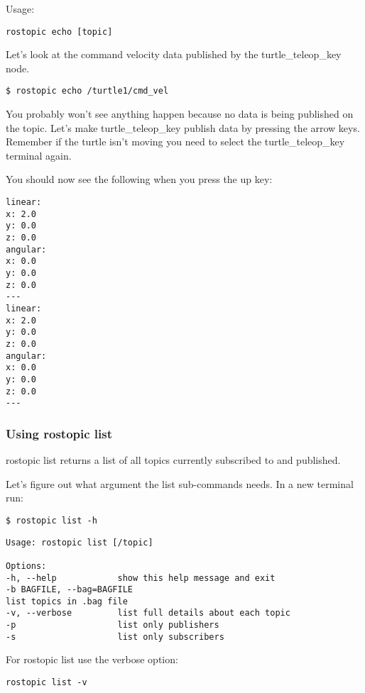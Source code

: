 Usage:
\begin{lstlisting}[breaklines=true languages=bash]
rostopic echo [topic]
\end{lstlisting}

Let's look at the command velocity data published by the turtle\_teleop\_key node.

\begin{lstlisting}[breaklines=true languages=bash]
$ rostopic echo /turtle1/cmd_vel
\end{lstlisting}

You probably won't see anything happen because no data is being published on the topic. Let's make turtle\_teleop\_key publish data by pressing the arrow keys. Remember if the turtle isn't moving you need to select the turtle\_teleop\_key terminal again.

You should now see the following when you press the up key:
\begin{lstlisting}[breaklines=true languages=bash]
linear: 
x: 2.0
y: 0.0
z: 0.0
angular: 
x: 0.0
y: 0.0
z: 0.0
---
linear: 
x: 2.0
y: 0.0
z: 0.0
angular: 
x: 0.0
y: 0.0
z: 0.0
---
\end{lstlisting}

\subsubsection{Using rostopic list}
rostopic list returns a list of all topics currently subscribed to and published.

Let's figure out what argument the list sub-commands needs. In a new terminal run:
\begin{lstlisting}[breaklines=true languages=bash]
$ rostopic list -h
\end{lstlisting}

\begin{lstlisting}[breaklines=true languages=bash]
Usage: rostopic list [/topic]

Options:
-h, --help            show this help message and exit
-b BAGFILE, --bag=BAGFILE
list topics in .bag file
-v, --verbose         list full details about each topic
-p                    list only publishers
-s                    list only subscribers
\end{lstlisting}

For rostopic list use the verbose option:
\begin{lstlisting}[breaklines=true languages=bash]
rostopic list -v
\end{lstlisting}

